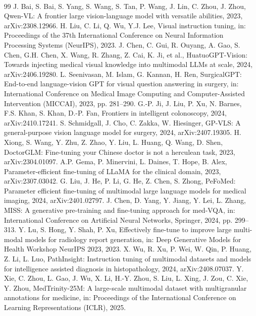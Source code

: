 ﻿﻿\documentclass[12pt]{report}
\begin{document}
\begin{thebibliography}{99}
 J. Bai, S. Bai, S. Yang, S. Wang, S. Tan, P. Wang, J. Lin, C. Zhou, J. Zhou, Qwen-VL: A frontier large vision-language model with versatile abilities, 2023, arXiv:2308.12966.
 H. Liu, C. Li, Q. Wu, Y.J. Lee, Visual instruction tuning, in: Proceedings of the 37th International Conference on Neural Information Processing Systems (NeurIPS), 2023.
 J. Chen, C. Gui, R. Ouyang, A. Gao, S. Chen, G.H. Chen, X. Wang, R. Zhang, Z. Cai, K. Ji, et al., HuatuoGPT-Vision: Towards injecting medical visual knowledge into multimodal LLMs at scale, 2024, arXiv:2406.19280.
 L. Seenivasan, M. Islam, G. Kannan, H. Ren, SurgicalGPT: End-to-end language-vision GPT for visual question answering in surgery, in: International Conference on Medical Image Computing and Computer-Assisted Intervention (MICCAI), 2023, pp. 281--290.
 G.-P. Ji, J. Liu, P. Xu, N. Barnes, F.S. Khan, S. Khan, D.-P. Fan, Frontiers in intelligent colonoscopy, 2024, arXiv:2410.17241.
 S. Schmidgall, J. Cho, C. Zakka, W. Hiesinger, GP-VLS: A general-purpose vision language model for surgery, 2024, arXiv:2407.19305.
 H. Xiong, S. Wang, Y. Zhu, Z. Zhao, Y. Liu, L. Huang, Q. Wang, D. Shen, DoctorGLM: Fine-tuning your Chinese doctor is not a herculean task, 2023, arXiv:2304.01097.
 A.P. Gema, P. Minervini, L. Daines, T. Hope, B. Alex, Parameter-efficient fine-tuning of LLaMA for the clinical domain, 2023, arXiv:2307.03042.
 G. Liu, J. He, P. Li, G. He, Z. Chen, S. Zhong, PeFoMed: Parameter efficient fine-tuning of multimodal large language models for medical imaging, 2024, arXiv:2401.02797.
 J. Chen, D. Yang, Y. Jiang, Y. Lei, L. Zhang, MISS: A generative pre-training and fine-tuning approach for med-VQA, in: International Conference on Artificial Neural Networks, Springer, 2024, pp. 299--313.
 Y. Lu, S. Hong, Y. Shah, P. Xu, Effectively fine-tune to improve large multi-modal models for radiology report generation, in: Deep Generative Models for Health Workshop NeurIPS 2023, 2023.
 X. Wu, R. Xu, P. Wei, W. Qin, P. Huang, Z. Li, L. Luo, PathInsight: Instruction tuning of multimodal datasets and models for intelligence assisted diagnosis in histopathology, 2024, arXiv:2408.07037.
 Y. Xie, C. Zhou, L. Gao, J. Wu, X. Li, H.-Y. Zhou, S. Liu, L. Xing, J. Zou, C. Xie, Y. Zhou, MedTrinity-25M: A large-scale multimodal dataset with multigranular annotations for medicine, in: Proceedings of the International Conference on Learning Representations (ICLR), 2025.

\end{thebibliography}
\end{document}
